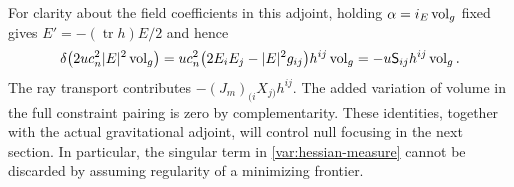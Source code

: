 For clarity about the field coefficients in this adjoint,
holding $\alpha=i_E\operatorname{vol}_g$ fixed gives
$E'=-(\operatorname{tr}h)E/2$ and hence
\begin{equation}
 \delta\bigl(2u c_n^2|E|^2\operatorname{vol}_g\bigr)
   =u c_n^2\bigl(2E_iE_j-|E|^2g_{ij}\bigr)h^{ij}\operatorname{vol}_g
   =-u\mathsf S_{ij}h^{ij}\operatorname{vol}_g.
 \label{var:electric-metric-adjoint}
\end{equation}
The ray transport contributes $-(J_m)_{(i}X_{j)}h^{ij}$.
The added variation of volume in the full constraint
pairing is zero by complementarity.  These identities,
together with the actual gravitational adjoint, will
control null focusing in the next section.  In
particular, the singular term in
\eqref{var:hessian-measure} cannot be discarded by
assuming regularity of a minimizing frontier.
